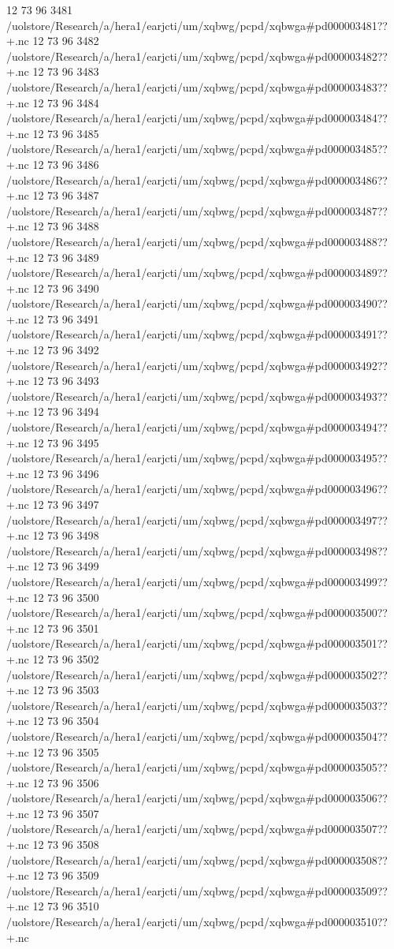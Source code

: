 12 73 96
3481
/uolstore/Research/a/hera1/earjcti/um/xqbwg/pcpd/xqbwga#pd000003481??+.nc
12 73 96
3482
/uolstore/Research/a/hera1/earjcti/um/xqbwg/pcpd/xqbwga#pd000003482??+.nc
12 73 96
3483
/uolstore/Research/a/hera1/earjcti/um/xqbwg/pcpd/xqbwga#pd000003483??+.nc
12 73 96
3484
/uolstore/Research/a/hera1/earjcti/um/xqbwg/pcpd/xqbwga#pd000003484??+.nc
12 73 96
3485
/uolstore/Research/a/hera1/earjcti/um/xqbwg/pcpd/xqbwga#pd000003485??+.nc
12 73 96
3486
/uolstore/Research/a/hera1/earjcti/um/xqbwg/pcpd/xqbwga#pd000003486??+.nc
12 73 96
3487
/uolstore/Research/a/hera1/earjcti/um/xqbwg/pcpd/xqbwga#pd000003487??+.nc
12 73 96
3488
/uolstore/Research/a/hera1/earjcti/um/xqbwg/pcpd/xqbwga#pd000003488??+.nc
12 73 96
3489
/uolstore/Research/a/hera1/earjcti/um/xqbwg/pcpd/xqbwga#pd000003489??+.nc
12 73 96
3490
/uolstore/Research/a/hera1/earjcti/um/xqbwg/pcpd/xqbwga#pd000003490??+.nc
12 73 96
3491
/uolstore/Research/a/hera1/earjcti/um/xqbwg/pcpd/xqbwga#pd000003491??+.nc
12 73 96
3492
/uolstore/Research/a/hera1/earjcti/um/xqbwg/pcpd/xqbwga#pd000003492??+.nc
12 73 96
3493
/uolstore/Research/a/hera1/earjcti/um/xqbwg/pcpd/xqbwga#pd000003493??+.nc
12 73 96
3494
/uolstore/Research/a/hera1/earjcti/um/xqbwg/pcpd/xqbwga#pd000003494??+.nc
12 73 96
3495
/uolstore/Research/a/hera1/earjcti/um/xqbwg/pcpd/xqbwga#pd000003495??+.nc
12 73 96
3496
/uolstore/Research/a/hera1/earjcti/um/xqbwg/pcpd/xqbwga#pd000003496??+.nc
12 73 96
3497
/uolstore/Research/a/hera1/earjcti/um/xqbwg/pcpd/xqbwga#pd000003497??+.nc
12 73 96
3498
/uolstore/Research/a/hera1/earjcti/um/xqbwg/pcpd/xqbwga#pd000003498??+.nc
12 73 96
3499
/uolstore/Research/a/hera1/earjcti/um/xqbwg/pcpd/xqbwga#pd000003499??+.nc
12 73 96
3500
/uolstore/Research/a/hera1/earjcti/um/xqbwg/pcpd/xqbwga#pd000003500??+.nc
12 73 96
3501
/uolstore/Research/a/hera1/earjcti/um/xqbwg/pcpd/xqbwga#pd000003501??+.nc
12 73 96
3502
/uolstore/Research/a/hera1/earjcti/um/xqbwg/pcpd/xqbwga#pd000003502??+.nc
12 73 96
3503
/uolstore/Research/a/hera1/earjcti/um/xqbwg/pcpd/xqbwga#pd000003503??+.nc
12 73 96
3504
/uolstore/Research/a/hera1/earjcti/um/xqbwg/pcpd/xqbwga#pd000003504??+.nc
12 73 96
3505
/uolstore/Research/a/hera1/earjcti/um/xqbwg/pcpd/xqbwga#pd000003505??+.nc
12 73 96
3506
/uolstore/Research/a/hera1/earjcti/um/xqbwg/pcpd/xqbwga#pd000003506??+.nc
12 73 96
3507
/uolstore/Research/a/hera1/earjcti/um/xqbwg/pcpd/xqbwga#pd000003507??+.nc
12 73 96
3508
/uolstore/Research/a/hera1/earjcti/um/xqbwg/pcpd/xqbwga#pd000003508??+.nc
12 73 96
3509
/uolstore/Research/a/hera1/earjcti/um/xqbwg/pcpd/xqbwga#pd000003509??+.nc
12 73 96
3510
/uolstore/Research/a/hera1/earjcti/um/xqbwg/pcpd/xqbwga#pd000003510??+.nc
